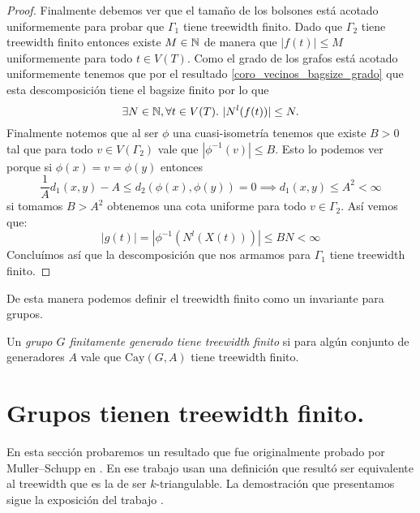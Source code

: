 \documentclass[tesis.tex]{subfiles}
\begin{document}
\begin{proof}
	Finalmente debemos ver que el tamaño de los bolsones está acotado uniformemente para probar que $\Gamma_{1}$ tiene treewidth finito.
	Dado que $\Gamma_2$ tiene treewidth finito entonces existe $M \in \mathbb{N}$ de manera que  $|f(t)| \le M$ uniformemente para todo $t \in V(T)$. 
	Como el grado de los grafos está acotado uniformemente tenemos que por el resultado \ref{coro_vecinos_bagsize_grado} que esta descomposición tiene el bagsize finito por lo que
	\[
	\exists N \in \mathbb{N}, \forall t \in V(T). \  |N^l(f(t))| \le N.
	\]
	Finalmente notemos que al ser $\phi$ una cuasi-isometría tenemos que existe $B > 0$ tal que para todo $v \in V(\Gamma_2)$ vale que $|\phi^{-1}(v)| \le B$.
	Esto lo podemos ver porque si $\phi(x) = v = \phi(y)$ entonces
	\[
	\frac{1}{A}d_{1}(x,y) - A \le d_{2}(\phi(x), \phi(y) ) = 0 \implies d_{1}(x,y) \le A^2 < \infty
	\]
	si tomamos $B > A^2$ obtenemos una cota uniforme para todo $v \in \Gamma_2$. 
	Así vemos que:
	\[
	|g(t)| = |\phi^{-1}(N^l(X(t)))| \le BN < \infty
	\]
	Concluímos así que la descomposición que nos armamos para $\Gamma_1$ tiene treewidth finito.
\end{proof}

De esta manera podemos definir el treewidth finito como un invariante para grupos.

\begin{deff}
	Un \emph{grupo $G$ finitamente generado tiene treewidth finito} si para algún conjunto de generadores $A$ vale que $\text{Cay}(G,A)$ tiene treewidth finito.
\end{deff}


\section{Grupos \ic tienen treewidth finito.}\label{secc_MuSch}

En esta sección probaremos un resultado que fue originalmente probado por Muller--Schupp en \cite{muller1985theory}.
En ese trabajo usan una definición que resultó ser equivalente al treewidth que es la de ser $k$-triangulable.
La demostración que presentamos sigue la exposición del trabajo \cite{diekert2017context}.
\end{document}
